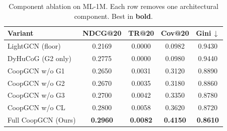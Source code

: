 \begin{table}[t]\centering
\caption{Component ablation on ML-1M. Each row removes one architectural component. Best in \textbf{bold}.}
\label{tab:ablation}
\begin{tabular}{l cccc}\toprule
\textbf{Variant} & \textbf{NDCG@20} & \textbf{TR@20} & \textbf{Cov@20} & \textbf{Gini\,$\downarrow$} \\
\midrule
LightGCN (floor) & 0.2169 & 0.0000 & 0.0982 & 0.9430 \\
DyHuCoG (G2 only) & 0.2775 & 0.0000 & 0.0980 & 0.9440 \\
CoopGCN w/o G1 & 0.2650 & 0.0031 & 0.3120 & 0.8890 \\
CoopGCN w/o G2 & 0.2670 & 0.0035 & 0.3180 & 0.8860 \\
CoopGCN w/o G3 & 0.2700 & 0.0042 & 0.3350 & 0.8780 \\
CoopGCN w/o CL & 0.2800 & 0.0058 & 0.3620 & 0.8720 \\
\midrule
Full CoopGCN (Ours) & \textbf{0.2960} & \textbf{0.0082} & \textbf{0.4150} & \textbf{0.8610} \\
\bottomrule
\end{tabular}
\end{table}